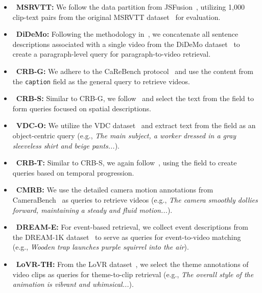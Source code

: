 \begin{itemize}
    \item~\textbf{MSRVTT:} We follow the data partition from JSFusion~\cite{yu2018joint}, utilizing 1,000 clip-text pairs from the original MSRVTT dataset~\cite{xu2016msr} for evaluation.

    \item~\textbf{DiDeMo:} Following the methodology in~\cite{liu2019use}, we concatenate all sentence descriptions associated with a single video from the DiDeMo dataset~\cite{anne2017localizing} to create a paragraph-level query for paragraph-to-video retrieval.

    \item~\textbf{CRB-G:} We adhere to the CaReBench protocol~\cite{xu2025carebench} and use the content from the \texttt{caption} field as the general query to retrieve videos.

    \item~\textbf{CRB-S:} Similar to CRB-G, we follow~\cite{xu2025carebench} and select the text from the  field to form queries focused on spatial descriptions.

    \item~\textbf{VDC-O:} We utilize the VDC dataset~\cite{chai2024auroracap} and extract text from the  field as an object-centric query (e.g., \textit{The main subject, a worker dressed in a gray sleeveless shirt and beige pants...}).

    \item~\textbf{CRB-T:} Similar to CRB-S, we again follow~\cite{xu2025carebench}, using the  field to create queries based on temporal progression.

    \item~\textbf{CMRB:} We use the detailed camera motion annotations from CameraBench~\cite{lin2025towards} as queries to retrieve videos (e.g., \textit{The camera smoothly dollies forward, maintaining a steady and fluid motion...}).

    \item~\textbf{DREAM-E:} For event-based retrieval, we collect event descriptions from the DREAM-1K dataset~\cite{wang2024tarsier} to serve as queries for event-to-video matching (e.g., \textit{Wooden trap launches purple squirrel into the air}).

    \item~\textbf{LoVR-TH:} From the LoVR dataset~\cite{cai2025lovr}, we select the theme annotations of video clips as queries for theme-to-clip retrieval (e.g., \textit{The overall style of the animation is vibrant and whimsical...}).


\end{itemize}
